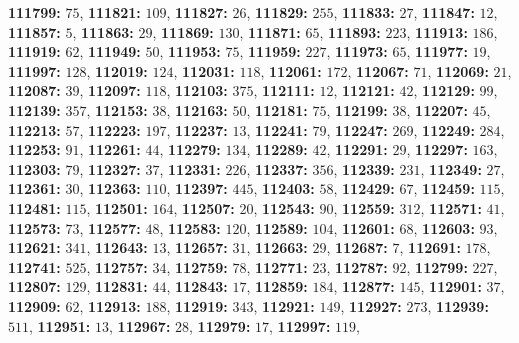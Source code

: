 \textsf{\bfseries 111799:} $75$, \textsf{\bfseries 111821:} $109$, \textsf{\bfseries 111827:} $26$, \textsf{\bfseries 111829:} $255$, \textsf{\bfseries 111833:} $27$, \textsf{\bfseries 111847:} $12$, \textsf{\bfseries 111857:} $5$, \textsf{\bfseries 111863:} $29$, \textsf{\bfseries 111869:} $130$, \textsf{\bfseries 111871:} $65$, \textsf{\bfseries 111893:} $223$, \textsf{\bfseries 111913:} $186$, \textsf{\bfseries 111919:} $62$, \textsf{\bfseries 111949:} $50$, \textsf{\bfseries 111953:} $75$, \textsf{\bfseries 111959:} $227$, \textsf{\bfseries 111973:} $65$, \textsf{\bfseries 111977:} $19$, \textsf{\bfseries 111997:} $128$, \textsf{\bfseries 112019:} $124$, \textsf{\bfseries 112031:} $118$, \textsf{\bfseries 112061:} $172$, \textsf{\bfseries 112067:} $71$, \textsf{\bfseries 112069:} $21$, \textsf{\bfseries 112087:} $39$, \textsf{\bfseries 112097:} $118$, \textsf{\bfseries 112103:} $375$, \textsf{\bfseries 112111:} $12$, \textsf{\bfseries 112121:} $42$, \textsf{\bfseries 112129:} $99$, \textsf{\bfseries 112139:} $357$, \textsf{\bfseries 112153:} $38$, \textsf{\bfseries 112163:} $50$, \textsf{\bfseries 112181:} $75$, \textsf{\bfseries 112199:} $38$, \textsf{\bfseries 112207:} $45$, \textsf{\bfseries 112213:} $57$, \textsf{\bfseries 112223:} $197$, \textsf{\bfseries 112237:} $13$, \textsf{\bfseries 112241:} $79$, \textsf{\bfseries 112247:} $269$, \textsf{\bfseries 112249:} $284$, \textsf{\bfseries 112253:} $91$, \textsf{\bfseries 112261:} $44$, \textsf{\bfseries 112279:} $134$, \textsf{\bfseries 112289:} $42$, \textsf{\bfseries 112291:} $29$, \textsf{\bfseries 112297:} $163$, \textsf{\bfseries 112303:} $79$, \textsf{\bfseries 112327:} $37$, \textsf{\bfseries 112331:} $226$, \textsf{\bfseries 112337:} $356$, \textsf{\bfseries 112339:} $231$, \textsf{\bfseries 112349:} $27$, \textsf{\bfseries 112361:} $30$, \textsf{\bfseries 112363:} $110$, \textsf{\bfseries 112397:} $445$, \textsf{\bfseries 112403:} $58$, \textsf{\bfseries 112429:} $67$, \textsf{\bfseries 112459:} $115$, \textsf{\bfseries 112481:} $115$, \textsf{\bfseries 112501:} $164$, \textsf{\bfseries 112507:} $20$, \textsf{\bfseries 112543:} $90$, \textsf{\bfseries 112559:} $312$, \textsf{\bfseries 112571:} $41$, \textsf{\bfseries 112573:} $73$, \textsf{\bfseries 112577:} $48$, \textsf{\bfseries 112583:} $120$, \textsf{\bfseries 112589:} $104$, \textsf{\bfseries 112601:} $68$, \textsf{\bfseries 112603:} $93$, \textsf{\bfseries 112621:} $341$, \textsf{\bfseries 112643:} $13$, \textsf{\bfseries 112657:} $31$, \textsf{\bfseries 112663:} $29$, \textsf{\bfseries 112687:} $7$, \textsf{\bfseries 112691:} $178$, \textsf{\bfseries 112741:} $525$, \textsf{\bfseries 112757:} $34$, \textsf{\bfseries 112759:} $78$, \textsf{\bfseries 112771:} $23$, \textsf{\bfseries 112787:} $92$, \textsf{\bfseries 112799:} $227$, \textsf{\bfseries 112807:} $129$, \textsf{\bfseries 112831:} $44$, \textsf{\bfseries 112843:} $17$, \textsf{\bfseries 112859:} $184$, \textsf{\bfseries 112877:} $145$, \textsf{\bfseries 112901:} $37$, \textsf{\bfseries 112909:} $62$, \textsf{\bfseries 112913:} $188$, \textsf{\bfseries 112919:} $343$, \textsf{\bfseries 112921:} $149$, \textsf{\bfseries 112927:} $273$, \textsf{\bfseries 112939:} $511$, \textsf{\bfseries 112951:} $13$, \textsf{\bfseries 112967:} $28$, \textsf{\bfseries 112979:} $17$, \textsf{\bfseries 112997:} $119$, 
